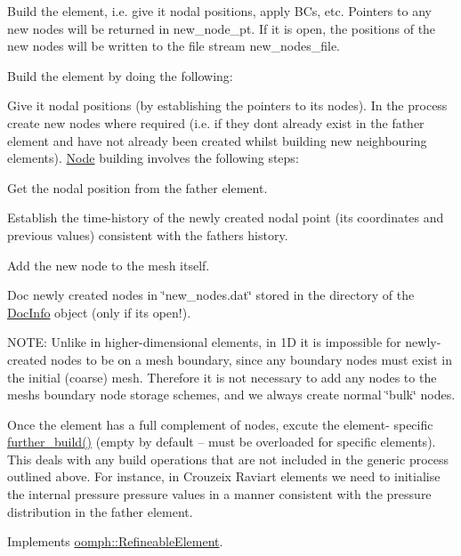 Build the element, i.\+e. give it nodal positions, apply B\+Cs, etc. Pointers to any new nodes will be returned in new\+\_\+node\+\_\+pt. If it is open, the positions of the new nodes will be written to the file stream new\+\_\+nodes\+\_\+file. 

Build the element by doing the following\+:
\begin{DoxyItemize}
\item Give it nodal positions (by establishing the pointers to its nodes). In the process create new nodes where required (i.\+e. if they don\textquotesingle{}t already exist in the father element and have not already been created whilst building new neighbouring elements). \hyperlink{classoomph_1_1Node}{Node} building involves the following steps\+:
\begin{DoxyItemize}
\item Get the nodal position from the father element.
\item Establish the time-\/history of the newly created nodal point (its coordinates and previous values) consistent with the father\textquotesingle{}s history.
\item Add the new node to the mesh itself.
\item Doc newly created nodes in \char`\"{}new\+\_\+nodes.\+dat\char`\"{} stored in the directory of the \hyperlink{classoomph_1_1DocInfo}{Doc\+Info} object (only if it\textquotesingle{}s open!).
\item N\+O\+TE\+: Unlike in higher-\/dimensional elements, in 1D it is impossible for newly-\/created nodes to be on a mesh boundary, since any boundary nodes must exist in the initial (coarse) mesh. Therefore it is not necessary to add any nodes to the mesh\textquotesingle{}s boundary node storage schemes, and we always create normal \char`\"{}bulk\char`\"{} nodes.
\end{DoxyItemize}
\item Once the element has a full complement of nodes, excute the element-\/ specific \hyperlink{classoomph_1_1RefineableElement_a26628ce36dfad028686adeb4694a9ef3}{further\+\_\+build()} (empty by default -- must be overloaded for specific elements). This deals with any build operations that are not included in the generic process outlined above. For instance, in Crouzeix Raviart elements we need to initialise the internal pressure pressure values in a manner consistent with the pressure distribution in the father element. 
\end{DoxyItemize}

Implements \hyperlink{classoomph_1_1RefineableElement_adc31f0903b4cbd9574017dda44cf6523}{oomph\+::\+Refineable\+Element}.



